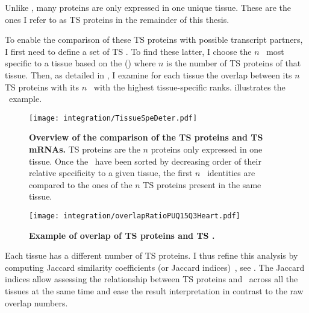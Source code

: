 Unlike \mRNAs,
many proteins are only expressed in one unique tissue.
These are the ones I refer to as \gls{TS} proteins in the remainder of this thesis.\mybr\

To enable the comparison of these \gls{TS} proteins with possible transcript partners,
I first need to define a set of \gls{TS} \mRNAs{}.
To find these latter, I choose the $n$ \mRNAs\ most specific to a tissue
based on the  ()
where $n$ is the number of \gls{TS} proteins of that tissue.
Then, as detailed in ,
I examine for each tissue the overlap between its $n$ \gls{TS} proteins
with its $n$ \mRNAs\ with the highest tissue-specific ranks.
 illustrates the \heart\ example.

\begin{figure}[!htb]
    \texttt{[image: integration/TissueSpeDeter.pdf]}\centering
    \vspace{-3mm}
    \caption[Determination process of the specific mRNAs]{%
    \label{fig:RankSpe}\textbf{Overview of the comparison of the TS proteins
    and TS mRNAs.}
    \gls{TS} proteins are the $n$ proteins only expressed in one tissue.
    Once the \mRNAs\ have been sorted
    by decreasing order of their relative specificity to a given tissue,
    the first $n$ \mRNAs\ identities are compared
    to the ones of the $n$ \gls{TS} proteins present in the same tissue.
    }
\end{figure}

\begin{figure}[!htbp]
\texttt{[image: integration/overlapRatioPUQ15Q3Heart.pdf]}\centering
\vspace{-3mm}
    \caption[Example of overlap of TS proteins and TS mRNAs for Heart]{%
    \label{fig:ExJacquard}\textbf{Example of overlap of \gls{TS} proteins
    and \gls{TS} \mRNAs.}}
\end{figure}

Each tissue has a different number of \gls{TS} proteins.
I thus refine this analysis
by computing Jaccard similarity coefficients
(or Jaccard indices)~,
see .
The Jaccard indices allow assessing
the relationship between \gls{TS} proteins and \mRNAs\
across all the tissues at the same time
and ease the result interpretation in contrast to the raw overlap numbers.


